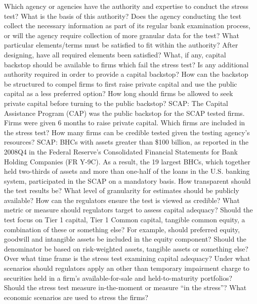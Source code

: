 \documentclass[12pt]{article}
\begin{document}
\begin{outline}[enumerate]

\1 Which agency or agencies have the authority and expertise to conduct the stress test?
\2 What is the basis of this authority?
\2 Does the agency conducting the test collect the necessary information as part of its regular bank examination process, or will the agency require collection of more granular data for the test?
\2 What particular elements/terms must be satisfied to fit within the authority?
\2 After designing, have all required elements been satisfied?
\1 What, if any, capital backstop should be available to firms which fail the stress test?
\2 Is any additional authority required in order to provide a capital backstop?
\2 How can the backstop be structured to compel firms to first raise private capital and use the public capital as a less preferred option?
\2 How long should firms be allowed to seek private capital before turning to the public backstop?
\2 SCAP: The Capital Assistance Program (CAP) was the public backstop for the SCAP tested firms. Firms were given 6 months to raise private capital.
\1 Which firms are included in the stress test?
\2 How many firms can be credible tested given the testing agency's resources?
\2 SCAP: BHCs with assets greater than \$100 billion, as reported in the 2008Q4 in the Federal Reserve’s Consolidated Financial Statements for Bank Holding Companies (FR Y-9C). As a result, the 19 largest BHCs, which together held two-thirds of assets and more than one-half of the loans in the U.S. banking system, participated in the SCAP on a mandatory basis.
\1 How transparent should the test results be? What level of granularity for estimates should be publicly available?
\1 How can the regulators ensure the test is viewed as credible?
\2 What metric or measure should regulators target to assess capital adequacy?
\3 Should the test focus on Tier 1 capital, Tier 1 Common capital, tangible common equity, a combination of these or something else?
\4 For example, should preferred equity, goodwill and intangible assets be included in the equity component?
\4 Should the denominator be based on risk-weighted assets, tangible assets or something else?
\3 Over what time frame is the stress test examining capital adequacy?
\3 Under what scenarios should regulators apply an other than temporary impairment charge to securities held in a firm's available-for-sale and held-to-maturity portfolios?
\2 Should the stress test measure in-the-moment or measure ``in the stress''?
\2 What economic scenarios are used to stress the firms?

\end{outline}
\end{document}
